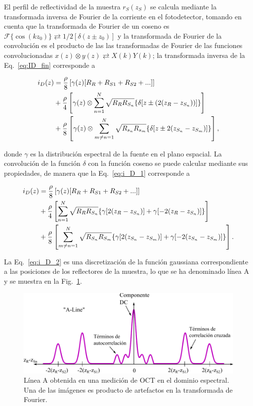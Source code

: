 El perfil de reflectividad de la muestra $r_S(z_S)$ se calcula mediante la transformada inversa de Fourier de la corriente en el fotodetector, tomando en cuenta que la transformada de Fourier de un coseno es $\mathscr{F}\{\cos(kz_0)\} \rightleftarrows 1/2[\delta(z\pm z_0)]$ y la transformada de Fourier de la convolución es el producto de las las transformadas de Fourier de las funciones convolucionadas $x(z) \otimes y(z) \rightleftarrows X(k)Y(k)$; la transformada inversa de la Eq.~\ref{eq:ID_fin} corresponde a

\begin{align}
\label{eq:i_D_1}
i_D(z) &= \frac{\rho}{8}\left[\gamma (z) [R_R + R_{S1} + R_{S2} + ...] \right]\\ \notag
&+ \frac{\rho}{4} \left[\gamma (z) \otimes \sum_{n=1}^{N} \sqrt{R_R R_{S_n}}\{\delta[z\pm (2(z_R-z_{S_n}))]\}\right]\\
&+ \frac{\rho}{8} \left[\gamma (z) \otimes \sum_{m\neq n = 1}^{N} \sqrt{R_{s_n}R_{s_m}} \{\delta [z\pm 2(z_{S_n} - z_{S_m})]\} \right],\notag
\end{align}

\noindent donde $\gamma$ es la distribución espectral de la fuente en el plano espacial. La convolución de la función $\delta$ con la función coseno se puede calcular mediante sus propiedades, de manera que la Eq.~\ref{eq:i_D_1} corresponde a

\begin{align}
\label{eq:i_D_2}
i_D(z) &= \frac{\rho}{8}\left[\gamma (z) [R_R + R_{S1} + R_{S2} + ...] \right]\\ \notag
&+ \frac{\rho}{4} \left[\sum_{n=1}^{N} \sqrt{R_R R_{S_n}}\{\gamma [2(z_R - z_{S_n}) ] + \gamma[-2(z_R - z_{S_n}) ]\}  \right]\\
&+ \frac{\rho}{8} \left[ \sum_{m\neq n = 1}^{N} \sqrt{R_{S_n}R_{S_m}} \{\gamma [2(z_{S_n} - z_{S_m}) ] + \gamma[-2(z_{S_n} - z_{S_m}) ]\}  \right].\notag
\end{align}

\noindent La Eq.~\ref{eq:i_D_2} es una discretización de la función gaussiana correspondiente a las posiciones de los reflectores de la muestra, lo que se ha denominado línea A y se muestra en la Fig.~\ref{fig:fdoct}.
\begin{figure}[ht!]
	\centering
	\includegraphics[width=\linewidth]{img/chap2/A_Line_FFT}
	\caption[Línea A obtenida en una medición de OCT en el dominio espectral]{Línea A obtenida en una medición de OCT en el dominio espectral. Una de las imágenes es producto de artefactos en la transformada de Fourier.}
	\label{fig:fdoct}
\end{figure}

